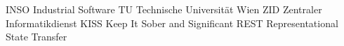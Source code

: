 	{INSO}	{Industrial Software}
	{TU}	{Technische Universit\"at Wien}
	{ZID}	{Zentraler Informatikdienst}
	{KISS}	{Keep It Sober and Significant}
	{REST}	{Representational State Transfer}